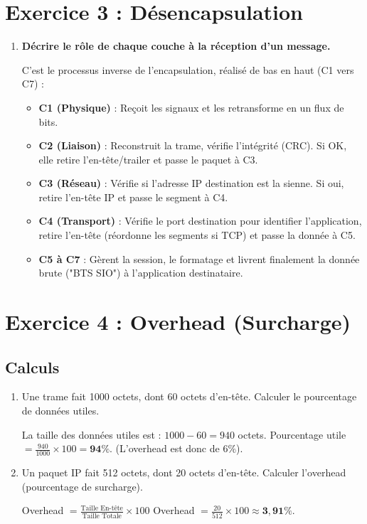 \documentclass[11pt, a4paper]{article}
\newenvironment{reponse}{\begin{reponsebox}}{\end{reponsebox}}
\begin{document}
\section{Exercice 3 : Désencapsulation}

\begin{enumerate}
    \item \textbf{Décrire le rôle de chaque couche à la réception d'un message.}
    \begin{reponse}
    C'est le processus inverse de l'encapsulation, réalisé de bas en haut (C1 vers C7) :
    \begin{itemize}
        \item \textbf{C1 (Physique)} : Reçoit les signaux et les retransforme en un flux de bits.
        \item \textbf{C2 (Liaison)} : Reconstruit la trame, vérifie l'intégrité (CRC). Si OK, elle retire l'en-tête/trailer et passe le paquet à C3.
        \item \textbf{C3 (Réseau)} : Vérifie si l'adresse IP destination est la sienne. Si oui, retire l'en-tête IP et passe le segment à C4.
        \item \textbf{C4 (Transport)} : Vérifie le port destination pour identifier l'application, retire l'en-tête (réordonne les segments si TCP) et passe la donnée à C5.
        \item \textbf{C5 à C7} : Gèrent la session, le formatage et livrent finalement la donnée brute ("BTS SIO") à l'application destinataire.
    \end{itemize}
    \end{reponse}
\end{enumerate}

\section{Exercice 4 : Overhead (Surcharge)}

\subsection{Calculs}

\begin{enumerate}
    \item Une trame fait 1000 octets, dont 60 octets d'en-tête. Calculer le pourcentage de données utiles.
    \begin{reponse}
    La taille des données utiles est : $1000 - 60 = 940$ octets.
    Pourcentage utile $= \frac{940}{1000} \times 100 = \mathbf{94\%}$.
    (L'overhead est donc de $6\% $).
    \end{reponse}
    \item Un paquet IP fait 512 octets, dont 20 octets d'en-tête. Calculer l'overhead (pourcentage de surcharge).
    \begin{reponse}
    Overhead $= \frac{\text{Taille En-tête}}{\text{Taille Totale}} \times 100$
    Overhead $= \frac{20}{512} \times 100 \approx \mathbf{3,91\%}$.
    \end{reponse}
\end{enumerate}
\end{document}
